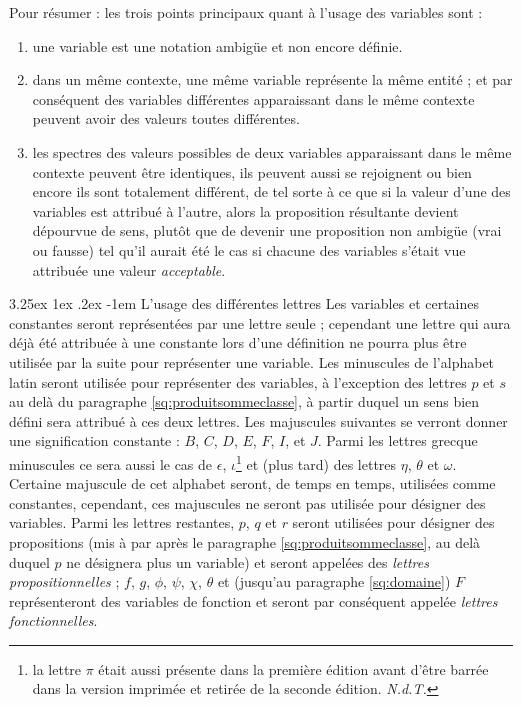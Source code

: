 \documentclass[a4paper]{book}
\makeatletter
\renewcommand\paragraph{\@startsection{paragraph}{5}{\z@}%
  {3.25ex \@plus1ex \@minus.2ex}%
  {-1em}%
  {\normalfont\normalsize\bfseries}}
\makeatother
\begin{document}
Pour résumer : les trois points principaux quant à l'usage des variables sont :
\begin{enumerate}
\item une variable est une notation ambigüe et non encore définie.
\item dans un même contexte, une même variable représente la même entité ; et par conséquent des variables différentes apparaissant dans le même contexte peuvent avoir des valeurs toutes différentes.
\item les spectres des valeurs possibles de deux variables apparaissant dans le même contexte peuvent être identiques, ils peuvent aussi se rejoignent ou bien encore ils sont totalement différent, de tel sorte à ce que si la valeur d'une des variables est attribué à l'autre, alors la proposition résultante devient dépourvue de sens, plutôt que de devenir une proposition non ambigüe (vrai ou fausse) tel qu'il aurait été le cas si chacune des variables s'était vue attribuée une valeur \textit{acceptable}.
\end{enumerate} 

\paragraph{L'usage des différentes lettres} Les variables et certaines constantes seront représentées par une lettre seule ; cependant une lettre qui aura déjà été attribuée à une constante lors d'une définition ne pourra plus être utilisée par la suite pour représenter une variable. Les minuscules de l'alphabet latin seront utilisée pour représenter des variables, à l'exception des lettres $p$ et $s$ au delà du paragraphe \ref{sq:produitsommeclasse}, à partir duquel un sens bien défini sera attribué à ces deux lettres. Les majuscules suivantes se verront donner une signification constante : $B$, $C$, $D$, $E$, $F$, $I$, et $J$. Parmi les lettres grecque minuscules ce sera aussi le cas de $\epsilon$, $\iota$\footnote{la lettre $\pi$ était aussi présente dans la première édition avant d'être barrée dans la version imprimée et retirée de la seconde édition. \textit{N.d.T.}} et (plus tard) des lettres $\eta$, $\theta$ et $\omega$. Certaine majuscule de cet alphabet seront, de temps en temps, utilisées comme constantes, cependant, ces majuscules ne seront pas utilisée pour désigner des variables. Parmi les lettres restantes, $p$, $q$ et $r$ seront utilisées pour désigner des propositions (mis à par après le paragraphe \ref{sq:produitsommeclasse}, au delà duquel $p$ ne désignera plus un variable) et seront appelées des \textit{lettres propositionnelles} ; $f$, $g$, $\phi$, $\psi$, $\chi $,
 $\theta$ et (jusqu'au paragraphe \ref{sq:domaine}) $F$ représenteront des variables de fonction et seront par conséquent appelée \textit{lettres fonctionnelles}.
\end{document}
